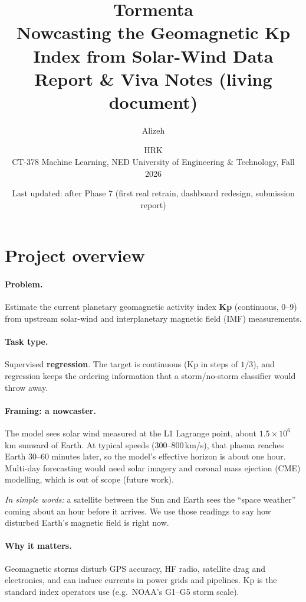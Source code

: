 \documentclass[11pt,a4paper]{article}
\title{\textbf{Tormenta}\\[2pt]\large Nowcasting the Geomagnetic Kp Index from Solar-Wind Data\\[2pt]
\normalsize Report \& Viva Notes (living document)}
\author{Alizeh \and HRK\\[2pt]\small CT-378 Machine Learning, NED University of Engineering \& Technology, Fall 2026}
\date{Last updated: after Phase 7 (first real retrain, dashboard redesign, submission report)}
\newcommand{\easy}[1]{\textit{In simple words:} #1}
\begin{document}
\maketitle
\tableofcontents
\newpage

\section{Project overview}
\paragraph{Problem.} Estimate the current planetary geomagnetic activity index \textbf{Kp} (continuous, 0--9) from
upstream solar-wind and interplanetary magnetic field (IMF) measurements.

\paragraph{Task type.} Supervised \textbf{regression}. The target is continuous (Kp in steps of $1/3$), and
regression keeps the ordering information that a storm/no-storm classifier would throw away.

\paragraph{Framing: a nowcaster.} The model sees solar wind measured at the L1 Lagrange point, about
$1.5\times10^6$\,km sunward of Earth. At typical speeds (300--800\,km/s), that plasma reaches Earth
30--60 minutes later, so the model's effective horizon is about one hour. Multi-day forecasting would need
solar imagery and coronal mass ejection (CME) modelling, which is out of scope (future work).

\easy{a satellite between the Sun and Earth sees the ``space weather'' coming about an hour before it
arrives. We use those readings to say how disturbed Earth's magnetic field is right now.}

\paragraph{Why it matters.} Geomagnetic storms disturb GPS accuracy, HF radio, satellite drag and
electronics, and can induce currents in power grids and pipelines. Kp is the standard index operators use
(e.g.\ NOAA's G1--G5 storm scale).
\end{document}
